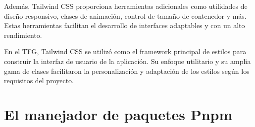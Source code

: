 Además, Tailwind CSS proporciona herramientas adicionales como utilidades de diseño responsivo, clases de animación, control de tamaño de contenedor y más. Estas herramientas facilitan el desarrollo de interfaces adaptables y con un alto rendimiento.

En el TFG, Tailwind CSS se utilizó como el framework principal de estilos para construir la interfaz de usuario de la aplicación. Su enfoque utilitario y su amplia gama de clases facilitaron la personalización y adaptación de los estilos según los requisitos del proyecto.

\section{El manejador de paquetes Pnpm}